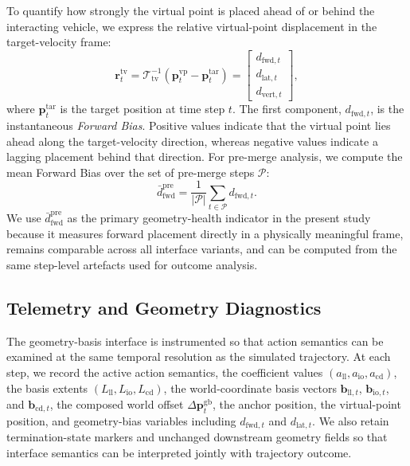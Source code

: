 \documentclass[drones,article,submit,pdftex,moreauthors]{Definitions/mdpi}
\begin{document}
To quantify how strongly the virtual point is placed ahead of or behind the interacting vehicle, we express the relative virtual-point displacement in the target-velocity frame:
\begin{equation}
\mathbf{r}^{\mathrm{tv}}_t
=
\mathcal{T}_{\mathrm{tv}}^{-1}
\left(
\mathbf{p}^{\mathrm{vp}}_t - \mathbf{p}^{\mathrm{tar}}_t
\right)
=
\begin{bmatrix}
d_{\mathrm{fwd},t} \\
d_{\mathrm{lat},t} \\
d_{\mathrm{vert},t}
\end{bmatrix},
\label{eq:forward_bias_vector}
\end{equation}
where $\mathbf{p}^{\mathrm{tar}}_t$ is the target position at time step $t$. The first component, $d_{\mathrm{fwd},t}$, is the instantaneous \emph{Forward Bias}. Positive values indicate that the virtual point lies ahead along the target-velocity direction, whereas negative values indicate a lagging placement behind that direction. For pre-merge analysis, we compute the mean Forward Bias over the set of pre-merge steps $\mathcal{P}$:
\begin{equation}
\bar{d}_{\mathrm{fwd}}^{\mathrm{pre}}
=
\frac{1}{|\mathcal{P}|}
\sum_{t \in \mathcal{P}} d_{\mathrm{fwd},t}.
\label{eq:premerge_forward_bias}
\end{equation}
We use $\bar{d}_{\mathrm{fwd}}^{\mathrm{pre}}$ as the primary geometry-health indicator in the present study because it measures forward placement directly in a physically meaningful frame, remains comparable across all interface variants, and can be computed from the same step-level artefacts used for outcome analysis.

\subsection{Telemetry and Geometry Diagnostics}

The geometry-basis interface is instrumented so that action semantics can be examined at the same temporal resolution as the simulated trajectory. At each step, we record the active action semantics, the coefficient values $(a_{\mathrm{ll}}, a_{\mathrm{io}}, a_{\mathrm{cd}})$, the basis extents $(L_{\mathrm{ll}}, L_{\mathrm{io}}, L_{\mathrm{cd}})$, the world-coordinate basis vectors $\mathbf{b}_{\mathrm{ll},t}$, $\mathbf{b}_{\mathrm{io},t}$, and $\mathbf{b}_{\mathrm{cd},t}$, the composed world offset $\Delta \mathbf{p}^{\mathrm{gb}}_t$, the anchor position, the virtual-point position, and geometry-bias variables including $d_{\mathrm{fwd},t}$ and $d_{\mathrm{lat},t}$. We also retain termination-state markers and unchanged downstream geometry fields so that interface semantics can be interpreted jointly with trajectory outcome.
\end{document}
